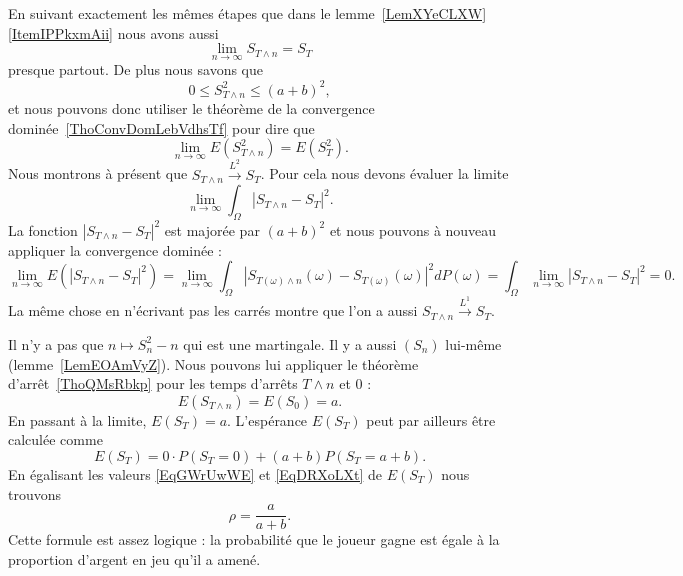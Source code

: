En suivant exactement les mêmes étapes que dans le lemme~\ref{LemXYeCLXW}\ref{ItemIPPkxmAii} nous avons aussi
\begin{equation}
	\lim_{n\to \infty} S_{T\wedge n}=S_T
\end{equation}
presque partout. De plus nous savons que
\begin{equation}
	0\leq S_{T\wedge n}^2\leq (a+b)^2,
\end{equation}
et nous pouvons donc utiliser le théorème de la convergence dominée~\ref{ThoConvDomLebVdhsTf} pour dire que
\begin{equation}
	\lim_{n\to \infty} E(S^2_{T\wedge n})=E(S_T^2).
\end{equation}
Nous montrons à présent que \( S_{T\wedge n}\stackrel{L^2}{\longrightarrow}S_T\). Pour cela nous devons évaluer la limite
\begin{equation}
	\lim_{n\to \infty} \int_{\Omega}| S_{T\wedge n}-S_T |^2.
\end{equation}
La fonction \( | S_{T\wedge n}-S_T |^2\) est majorée par \( (a+b)^2\) et nous pouvons à nouveau appliquer la convergence dominée :
\begin{equation}
	\lim_{n\to \infty} E(| S_{T\wedge n}-S_T |^2)=\lim_{n\to \infty} \int_{\Omega}| S_{T(\omega)\wedge n}(\omega)-S_{T(\omega)}(\omega) |^2dP(\omega)=\int_{\Omega}\lim_{n\to \infty} | S_{T\wedge n}-S_T |^2=0.
\end{equation}
La même chose en n'écrivant pas les carrés montre que l'on a aussi \( S_{T\wedge n}\stackrel{L^1}{\longrightarrow}S_T\).

Il n'y a pas que \( n\mapsto S_n^2-n\) qui est une martingale. Il y a aussi \( (S_n)\) lui-même (lemme~\ref{LemEOAmVyZ}). Nous pouvons lui appliquer le théorème d'arrêt~\ref{ThoQMsRbkp} pour les temps d'arrêts \( T\wedge n\) et \( 0\) :
\begin{equation}    \label{EqGWrUwWE}
	E(S_{T\wedge n})=E(S_0)=a.
\end{equation}
En passant à la limite, \( E(S_T)=a\). L'espérance \( E(S_T)\) peut par ailleurs être calculée comme
\begin{equation}    \label{EqDRXoLXt}
	E(S_T)=0\cdot P(S_T=0)+(a+b)P(S_T=a+b).
\end{equation}
En égalisant les valeurs \eqref{EqGWrUwWE} et \eqref{EqDRXoLXt} de \( E(S_T)\) nous trouvons
\begin{equation}    \label{EqIHhbeCB}
	\rho=\frac{ a }{ a+b }.
\end{equation}
Cette formule est assez logique : la probabilité que le joueur gagne est égale à la proportion d'argent en jeu qu'il a amené.

